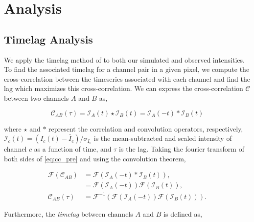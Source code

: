 \section{Analysis}\label{analysis}


\subsection{Timelag Analysis}\label{timelag_analysis}

We apply the timelag method of \citet{viall_evidence_2012} to both our simulated and observed intensities. To find the associated timelag for a channel pair in a given pixel, we compute the cross-correlation between the timeseries associated with each channel and find the lag which maximizes this cross-correlation. We can express the cross-correlation $\mathcal{C}$ between two channels $A$ and $B$ as,

\begin{equation}\label{eq:cc_pre}
    \mathcal{C}_{AB}(\tau) = \mathcal{I}_A(t)\star\mathcal{I}_B(t) = \mathcal{I}_A(-t)\ast\mathcal{I}_B(t)
\end{equation}

where $\star$ and $\ast$ represent the correlation and convolution operators, respectively, $\mathcal{I}_c(t)=(I_c(t)-\bar{I}_c)/\sigma_{I_c}$ is the mean-subtracted and scaled intensity of channel $c$ as a function of time, and $\tau$ is the lag. Taking the fourier transform of both sides of \autoref{eq:cc_pre} and using the convolution theorem,

\begin{align}\label{eq:cc}
    \mathcal{F}(\mathcal{C}_{AB}) &= \mathcal{F}(\mathcal{I}_A(-t)\ast\mathcal{I}_B(t)), \nonumber\\
    &= \mathcal{F}(\mathcal{I}_A(-t))\mathcal{F}(\mathcal{I}_B(t)), \nonumber\\
    \mathcal{C}_{AB}(\tau) &= \mathcal{F}^{-1}(\mathcal{F}(\mathcal{I}_A(-t))\mathcal{F}(\mathcal{I}_B(t))).
\end{align}

Furthermore, the \textit{timelag} between channels $A$ and $B$ is defined as,

